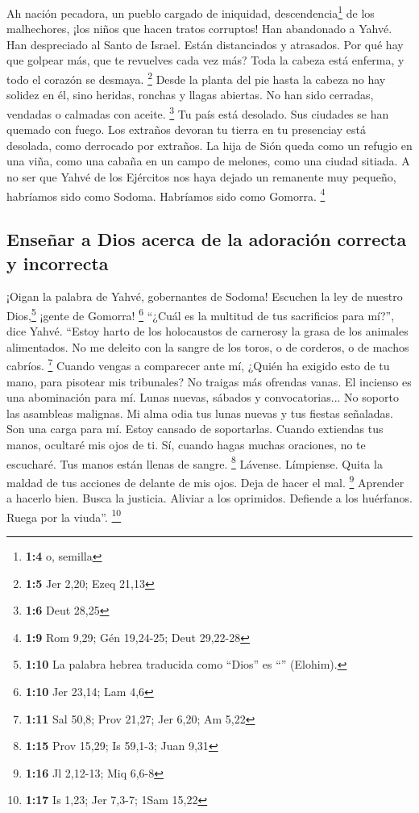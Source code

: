 \begin{paracol}{2}
 Ah nación pecadora, un pueblo cargado de iniquidad,
descendencia\footnote{\textbf{1:4} o, semilla} de los malhechores, ¡los
niños que hacen tratos corruptos! Han abandonado a Yahvé. Han
despreciado al Santo de Israel. Están distanciados y atrasados.
 Por qué hay que golpear más, que te revuelves cada vez
más? Toda la cabeza está enferma, y todo el corazón se desmaya.
\footnote{\textbf{1:5} Jer 2,20; Ezeq 21,13}  Desde la
planta del pie hasta la cabeza no hay solidez en él, sino heridas,
ronchas y llagas abiertas. No han sido cerradas, vendadas o calmadas con
aceite. \footnote{\textbf{1:6} Deut 28,25}  Tu país está
desolado. Sus ciudades se han quemado con fuego. Los extraños devoran tu
tierra en tu presenciay está desolada, como derrocado por extraños.
 La hija de Sión queda como un refugio en una viña, como
una cabaña en un campo de melones, como una ciudad sitiada.
 A no ser que Yahvé de los Ejércitos nos haya dejado un
remanente muy pequeño, habríamos sido como Sodoma. Habríamos sido como
Gomorra. \footnote{\textbf{1:9} Rom 9,29; Gén 19,24-25; Deut 29,22-28}

\hypertarget{enseuxf1ar-a-dios-acerca-de-la-adoraciuxf3n-correcta-y-incorrecta}{%
\subsection{Enseñar a Dios acerca de la adoración correcta y
incorrecta}\label{enseuxf1ar-a-dios-acerca-de-la-adoraciuxf3n-correcta-y-incorrecta}}

 ¡Oigan la palabra de Yahvé, gobernantes de Sodoma!
Escuchen la ley de nuestro Dios,\footnote{\textbf{1:10} La palabra
  hebrea traducida como ``Dios'' es ``'' (Elohim).} ¡gente
de Gomorra! \footnote{\textbf{1:10} Jer 23,14; Lam 4,6} 
``¿Cuál es la multitud de tus sacrificios para mí?'', dice Yahvé.
``Estoy harto de los holocaustos de carnerosy la grasa de los animales
alimentados. No me deleito con la sangre de los toros, o de corderos, o
de machos cabríos. \footnote{\textbf{1:11} Sal 50,8; Prov 21,27; Jer
  6,20; Am 5,22}  Cuando vengas a comparecer ante mí,
¿Quién ha exigido esto de tu mano, para pisotear mis tribunales?
 No traigas más ofrendas vanas. El incienso es una
abominación para mí. Lunas nuevas, sábados y convocatorias... No soporto
las asambleas malignas.  Mi alma odia tus lunas nuevas y
tus fiestas señaladas. Son una carga para mí. Estoy cansado de
soportarlas.  Cuando extiendas tus manos, ocultaré mis
ojos de ti. Sí, cuando hagas muchas oraciones, no te escucharé. Tus
manos están llenas de sangre. \footnote{\textbf{1:15} Prov 15,29; Is
  59,1-3; Juan 9,31}  Lávense. Límpiense. Quita la maldad
de tus acciones de delante de mis ojos. Deja de hacer el mal.
\footnote{\textbf{1:16} Jl 2,12-13; Miq 6,6-8}  Aprender
a hacerlo bien. Busca la justicia. Aliviar a los oprimidos. Defiende a
los huérfanos. Ruega por la viuda''. \footnote{\textbf{1:17} Is 1,23;
  Jer 7,3-7; 1Sam 15,22}


\end{paracol}
